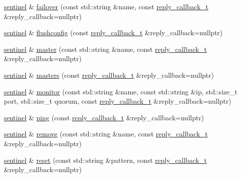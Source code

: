 \begin{DoxyCompactItemize}
\item 
\hyperlink{classcpp__redis_1_1sentinel}{sentinel} \& \hyperlink{classcpp__redis_1_1sentinel_abd4ee07b5a17ca15b74d25702687e53a}{failover} (const std\+::string \&name, const \hyperlink{classcpp__redis_1_1sentinel_ae1a150ff8787208c47414397a061c9a7}{reply\+\_\+callback\+\_\+t} \&reply\+\_\+callback=nullptr)
\item 
\hyperlink{classcpp__redis_1_1sentinel}{sentinel} \& \hyperlink{classcpp__redis_1_1sentinel_ab3c3a6822ebd512217280b0ca1a0f29f}{flushconfig} (const \hyperlink{classcpp__redis_1_1sentinel_ae1a150ff8787208c47414397a061c9a7}{reply\+\_\+callback\+\_\+t} \&reply\+\_\+callback=nullptr)
\item 
\hyperlink{classcpp__redis_1_1sentinel}{sentinel} \& \hyperlink{classcpp__redis_1_1sentinel_a3d08fbc6ae90b93613f0b3c56a6bf1fe}{master} (const std\+::string \&name, const \hyperlink{classcpp__redis_1_1sentinel_ae1a150ff8787208c47414397a061c9a7}{reply\+\_\+callback\+\_\+t} \&reply\+\_\+callback=nullptr)
\item 
\hyperlink{classcpp__redis_1_1sentinel}{sentinel} \& \hyperlink{classcpp__redis_1_1sentinel_aed4cacf43432630eb2934ce8b8dec104}{masters} (const \hyperlink{classcpp__redis_1_1sentinel_ae1a150ff8787208c47414397a061c9a7}{reply\+\_\+callback\+\_\+t} \&reply\+\_\+callback=nullptr)
\item 
\hyperlink{classcpp__redis_1_1sentinel}{sentinel} \& \hyperlink{classcpp__redis_1_1sentinel_ad4ae72b60a5a03977cda0d3e1f4ee48d}{monitor} (const std\+::string \&name, const std\+::string \&ip, std\+::size\+\_\+t port, std\+::size\+\_\+t quorum, const \hyperlink{classcpp__redis_1_1sentinel_ae1a150ff8787208c47414397a061c9a7}{reply\+\_\+callback\+\_\+t} \&reply\+\_\+callback=nullptr)
\item 
\hyperlink{classcpp__redis_1_1sentinel}{sentinel} \& \hyperlink{classcpp__redis_1_1sentinel_aba0190b2773d4d1f8d5e4c5aac22ce19}{ping} (const \hyperlink{classcpp__redis_1_1sentinel_ae1a150ff8787208c47414397a061c9a7}{reply\+\_\+callback\+\_\+t} \&reply\+\_\+callback=nullptr)
\item 
\hyperlink{classcpp__redis_1_1sentinel}{sentinel} \& \hyperlink{classcpp__redis_1_1sentinel_aee344f7f63bc02d13cb9dce08d48d5d9}{remove} (const std\+::string \&name, const \hyperlink{classcpp__redis_1_1sentinel_ae1a150ff8787208c47414397a061c9a7}{reply\+\_\+callback\+\_\+t} \&reply\+\_\+callback=nullptr)
\item 
\hyperlink{classcpp__redis_1_1sentinel}{sentinel} \& \hyperlink{classcpp__redis_1_1sentinel_a11d5f170474aa881df3b6f3cbbde3569}{reset} (const std\+::string \&pattern, const \hyperlink{classcpp__redis_1_1sentinel_ae1a150ff8787208c47414397a061c9a7}{reply\+\_\+callback\+\_\+t} \&reply\+\_\+callback=nullptr)

\end{DoxyCompactItemize}
